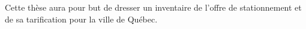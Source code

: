 Cette thèse aura pour but de dresser un inventaire de l'offre de stationnement et de sa tarification pour la ville de Québec.







